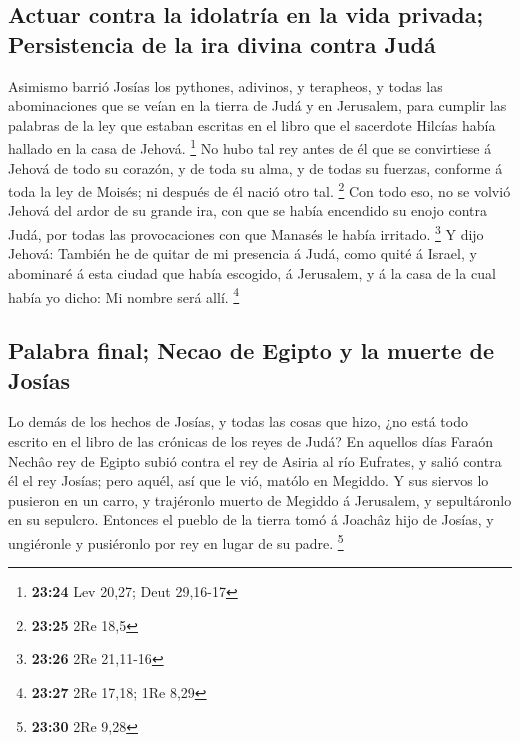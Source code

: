 \hypertarget{actuar-contra-la-idolatruxeda-en-la-vida-privada-persistencia-de-la-ira-divina-contra-juduxe1}{%
\subsection{Actuar contra la idolatría en la vida privada; Persistencia
de la ira divina contra
Judá}\label{actuar-contra-la-idolatruxeda-en-la-vida-privada-persistencia-de-la-ira-divina-contra-juduxe1}}

 Asimismo barrió Josías los pythones, adivinos, y
terapheos, y todas las abominaciones que se veían en la tierra de Judá y
en Jerusalem, para cumplir las palabras de la ley que estaban escritas
en el libro que el sacerdote Hilcías había hallado en la casa de Jehová.
\footnote{\textbf{23:24} Lev 20,27; Deut 29,16-17}  No hubo
tal rey antes de él que se convirtiese á Jehová de todo su corazón, y de
toda su alma, y de todas su fuerzas, conforme á toda la ley de Moisés;
ni después de él nació otro tal. \footnote{\textbf{23:25} 2Re 18,5}
 Con todo eso, no se volvió Jehová del ardor de su grande
ira, con que se había encendido su enojo contra Judá, por todas las
provocaciones con que Manasés le había irritado. \footnote{\textbf{23:26}
  2Re 21,11-16}  Y dijo Jehová: También he de quitar de mi
presencia á Judá, como quité á Israel, y abominaré á esta ciudad que
había escogido, á Jerusalem, y á la casa de la cual había yo dicho: Mi
nombre será allí. \footnote{\textbf{23:27} 2Re 17,18; 1Re 8,29}

\hypertarget{palabra-final-necao-de-egipto-y-la-muerte-de-josuxedas}{%
\subsection{Palabra final; Necao de Egipto y la muerte de
Josías}\label{palabra-final-necao-de-egipto-y-la-muerte-de-josuxedas}}

 Lo demás de los hechos de Josías, y todas las cosas que
hizo, ¿no está todo escrito en el libro de las crónicas de los reyes de
Judá?  En aquellos días Faraón Nechâo rey de Egipto subió
contra el rey de Asiria al río Eufrates, y salió contra él el rey
Josías; pero aquél, así que le vió, matólo en Megiddo.  Y
sus siervos lo pusieron en un carro, y trajéronlo muerto de Megiddo á
Jerusalem, y sepultáronlo en su sepulcro. Entonces el pueblo de la
tierra tomó á Joachâz hijo de Josías, y ungiéronle y pusiéronlo por rey
en lugar de su padre. \footnote{\textbf{23:30} 2Re 9,28}

